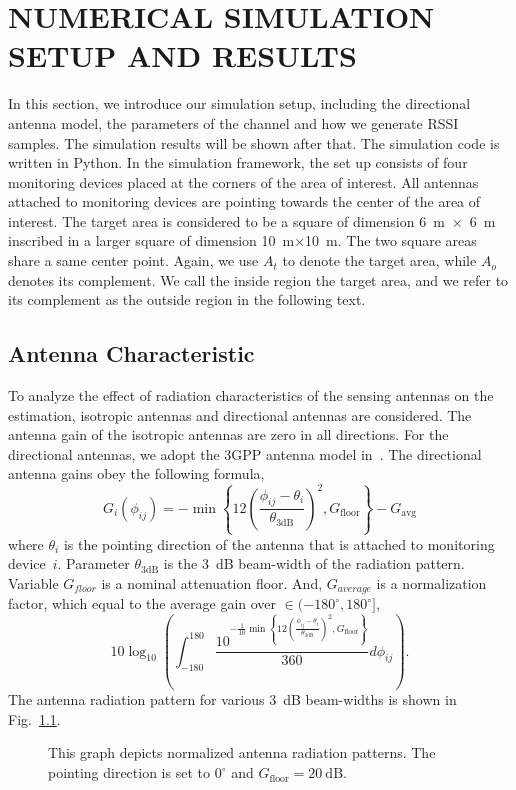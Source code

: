 \chapter{NUMERICAL SIMULATION SETUP AND RESULTS}

In this section, we introduce our simulation setup, including the directional antenna model, the parameters of the channel and how we generate RSSI samples.
The simulation results will be shown after that.
The simulation code is written in Python.
In the simulation framework, the set up consists of four monitoring devices placed at the corners of the area of interest.
All antennas attached to monitoring devices are pointing towards the center of the area of interest.
The target area is considered to be a square of dimension 6~m~×~6~m inscribed in a larger square of dimension 10~m×10~m.
The two square areas share a same center point.
Again, we use $A_{t}$ to denote the target area, while $A_{o}$ denotes its complement.
We call the inside region the target area, and we refer to its complement as the outside region in the following text.


\section{Antenna Characteristic}

To analyze the effect of radiation characteristics of the sensing antennas on the estimation, isotropic antennas and directional antennas are considered.
The antenna gain of the isotropic antennas are zero in all directions.
For the directional antennas, we adopt the 3GPP antenna model in~\cite{3GPP-antenna}.
The directional antenna gains obey the following formula,
\begin{equation*}
G_i (\phi_{ij}) = - \min \left\{
12 \left( \frac{\phi_{ij} - \theta_{i}}{\theta_{\mathrm{3dB}}} \right)^2,
G_{\mathrm{floor}} \right\} - G_{\mathrm{avg}}
\end{equation*}
where $\theta_{i}$ is the pointing direction of the antenna that is attached to monitoring device~$i$.
Parameter $\theta_{\mathrm{3dB}}$ is the 3~dB beam-width of the radiation pattern.
Variable $G_{floor}$ is a nominal attenuation floor.
And, $G_{average}$ is a normalization factor, which equal to the average gain over $\in (-180^{\circ}, 180^{\circ}]$,
\begin{equation*}
10 \log_{10} \left( \int_{-180}^{180}
\frac{ 10^{ - \frac{1}{10} \min \left\{
12 \left( \frac{\phi_{ij} - \theta_{i}}{\theta_{\mathrm{3dB}}} \right)^2,
G_{\mathrm{floor}} \right\} } }{360} d \phi_{ij} \right) .
\end{equation*}
The antenna radiation pattern for various 3~dB beam-widths is shown in Fig.~\ref{figure:AntennaCandidates}.
\begin{figure}[t]
	\centerline{}
	\caption{This graph depicts normalized antenna radiation patterns. The pointing direction is set to $ 0^{\circ}$ and $G_{\mathrm{floor}} = 20~\mathrm{dB}$.}
	\label{figure:AntennaCandidates}
\end{figure}



